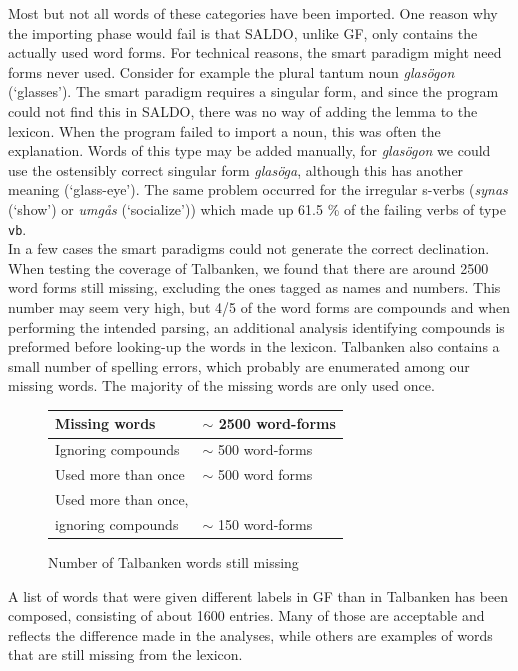 \documentclass[10pt, a4paper]{article}
\begin{document}
Most but not all words of these categories have been imported.
One reason why the importing phase would fail 
is that SALDO, unlike GF, only contains the actually used word forms.
For technical reasons, the smart paradigm might need forms never used.
Consider for example the plural tantum 
noun \emph{glas{\"o}gon} (`glasses').
The smart paradigm requires a singular form, and since the program could not
find this in SALDO, there was no way of adding the lemma to the lexicon. 
When the program failed to import a noun, this was often the explanation.
Words of this type may be added manually, for \emph{glas{\"o}gon} we could use
the ostensibly correct singular form \emph{glas{\"o}ga}, although this
has another meaning (`glass-eye').
The same problem occurred for the irregular s-verbs
(\emph{synas} (`show') or \emph{umg{\aa}s} (`socialize'))
which made up 61.5 \% of the failing verbs of type \verb_vb_.\\
In a few cases the smart paradigms could not generate the correct declination.\\
When testing the coverage of Talbanken,
we found that there are around 2500 word forms still missing, excluding the ones
tagged as names and numbers. This number may seem very high, but 
4/5 of the word forms are compounds and when performing the intended parsing,
an additional analysis identifying compounds is preformed before
looking-up the words in the lexicon. 
Talbanken also contains a small number of 
spelling errors, which probably are enumerated among our missing words. The majority
of the missing words are only used once.\\
\begin{figure}[h]
\begin{tabular}{|l|l|}
\hline
Missing words &$\sim$ 2500 word-forms\\
\hline
\hline
Ignoring compounds & $\sim$ 500 word-forms\\
Used more than once & $\sim$ 500 word forms\\
Used more than once,& \\
\hspace{2mm} ignoring compounds & $\sim$ 150 word-forms\\
\hline
\end{tabular}
\caption{Number of Talbanken words still missing}
\end{figure}
A list of words that were given different labels in GF than in Talbanken has been
composed, consisting of about 1600 entries. Many of those are
acceptable and reflects the difference 
made in the analyses, while
others are examples of words that are still missing from
the lexicon.
\end{document}
